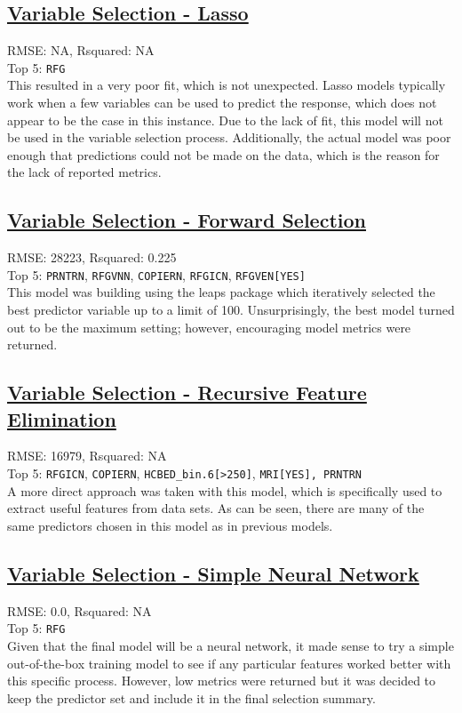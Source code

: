 \subsection{\hyperref[appendix:electricity:l]{Variable Selection - Lasso}}
RMSE: NA, Rsquared: NA\\
 Top 5: \lstinline{RFG}
\\[0.1in]
\indent This resulted in a very poor fit, which is not unexpected.  Lasso models typically work when a few variables can be used to predict the response, which does not appear to be the case in this instance.  Due to the lack of fit, this model will not be used in the variable selection process.  Additionally, the actual model was poor enough that predictions could not be made on the data, which is the reason for the lack of reported metrics.

\subsection{\hyperref[appendix:electricity:lp]{Variable Selection - Forward Selection}}
RMSE: 28223, Rsquared: 0.225\\
Top 5: \lstinline{PRNTRN}, \lstinline{RFGVNN}, \lstinline{COPIERN}, \lstinline{RFGICN}, \lstinline{RFGVEN[YES]}
\\[0.1in]
\indent This model was building using the leaps package which iteratively selected the best predictor variable up to a limit of 100.  Unsurprisingly, the best model turned out to be the maximum setting; however, encouraging model metrics were returned.

\subsection{\hyperref[appendix:electricity:rfe]{Variable Selection - Recursive Feature Elimination}}
RMSE: 16979, Rsquared: NA\\
Top 5: \lstinline{RFGICN}, \lstinline{COPIERN}, \lstinline{HCBED_bin.6[>250]}, \lstinline{MRI[YES], PRNTRN}
\\[0.1in]
\indent A more direct approach was taken with this model, which is specifically used to extract useful features from data sets.  As can be seen, there are many of the same predictors chosen in this model as in previous models.

\subsection{\hyperref[appendix:electricity:snn]{Variable Selection - Simple Neural Network}}
RMSE: 0.0, Rsquared: NA\\
Top 5: \lstinline{RFG}
\\[0.1in]
\indent Given that the final model will be a neural network, it made sense to try a simple out-of-the-box training model to see if any particular features worked better with this specific process.  However, low metrics were returned but it was decided to keep the predictor set and include it in the final selection summary.

